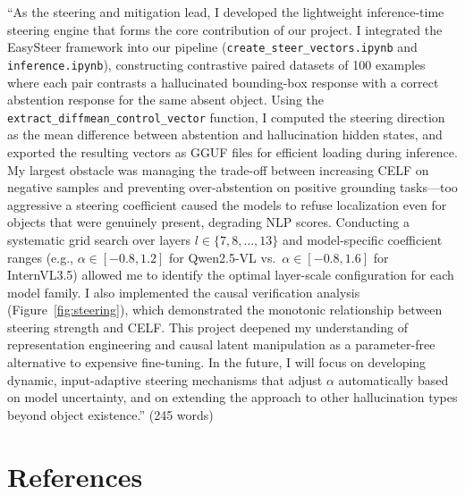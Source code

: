 \documentclass[12pt,a4paper]{article}
\begin{document}
``As the steering and mitigation lead, I developed the lightweight inference-time steering engine that forms the core contribution of our project. I integrated the EasySteer framework into our pipeline (\texttt{create\_steer\_vectors.ipynb} and \texttt{inference.ipynb}), constructing contrastive paired datasets of 100 examples where each pair contrasts a hallucinated bounding-box response with a correct abstention response for the same absent object. Using the \texttt{extract\_diffmean\_control\_vector} function, I computed the steering direction as the mean difference between abstention and hallucination hidden states, and exported the resulting vectors as GGUF files for efficient loading during inference. My largest obstacle was managing the trade-off between increasing CELF on negative samples and preventing over-abstention on positive grounding tasks---too aggressive a steering coefficient caused the models to refuse localization even for objects that were genuinely present, degrading NLP scores. Conducting a systematic grid search over layers $l \in \{7, 8, \ldots, 13\}$ and model-specific coefficient ranges (e.g., $\alpha \in [-0.8, 1.2]$ for Qwen2.5-VL vs.\ $\alpha \in [-0.8, 1.6]$ for InternVL3.5) allowed me to identify the optimal layer-scale configuration for each model family. I also implemented the causal verification analysis (Figure~\ref{fig:steering}), which demonstrated the monotonic relationship between steering strength and CELF. This project deepened my understanding of representation engineering and causal latent manipulation as a parameter-free alternative to expensive fine-tuning. In the future, I will focus on developing dynamic, input-adaptive steering mechanisms that adjust $\alpha$ automatically based on model uncertainty, and on extending the approach to other hallucination types beyond object existence.'' (245 words)

\section{References}
\end{document}
